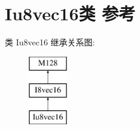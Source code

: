 \hypertarget{class_iu8vec16}{}\section{Iu8vec16类 参考}
\label{class_iu8vec16}
类 Iu8vec16 继承关系图\+:\begin{figure}[H]
\begin{center}
\leavevmode
\includegraphics[height=3.000000cm]{class_iu8vec16}
\end{center}
\end{figure}
